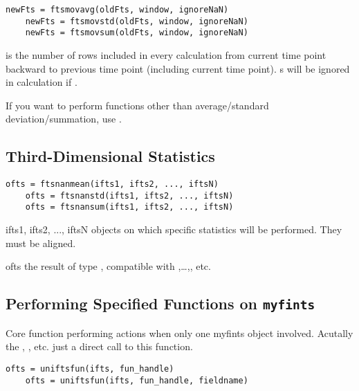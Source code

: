 \usage
   \begin{lstlisting}[numbers=none]
    newFts = ftsmovavg(oldFts, window, ignoreNaN)
    newFts = ftsmovstd(oldFts, window, ignoreNaN)
    newFts = ftsmovsum(oldFts, window, ignoreNaN)
   \end{lstlisting}
\where
    is the number of rows included in every calculation from current time point 
   backward to previous time point (including current time point).
   s will be ignored in calculation if .
   
If you want to perform functions other than average/standard deviation/summation,
use .


\subsection{Third-Dimensional Statistics}

\usage
   \begin{lstlisting}[numbers=none]
    ofts = ftsnanmean(ifts1, ifts2, ..., iftsN)
    ofts = ftsnanstd(ifts1, ifts2, ..., iftsN)
    ofts = ftsnansum(ifts1, ifts2, ..., iftsN)
   \end{lstlisting}
\inarg
   \begin{argdesc}
   \item[ifts1, ifts2, ..., iftsN] \myfints{} objects on which specific statistics
        will be performed.
        They must be aligned.
   \end{argdesc}

\outarg
   \begin{argdesc}
   \item[ofts] the result of type \myfints{}, compatible with ,\ldots,, etc. 
   \end{argdesc}

  
\subsection{Performing Specified Functions on \texttt{myfints}}

    Core function performing actions when only one myfints object
    involved.
    Acutally the , , etc. just a direct call to
    this function.

\usage
   \begin{lstlisting}[numbers=none]
    ofts = uniftsfun(ifts, fun_handle)
    ofts = uniftsfun(ifts, fun_handle, fieldname)
   \end{lstlisting}

